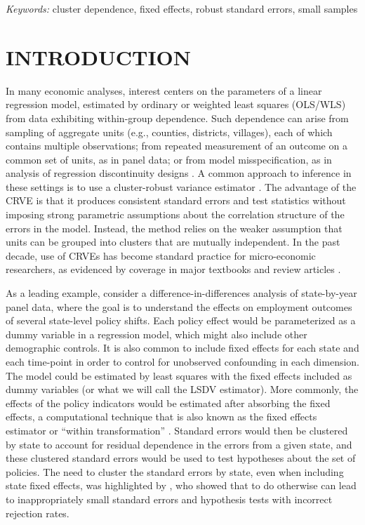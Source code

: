 \documentclass[12pt]{article}\usepackage[]{graphicx}\usepackage[]{color}
\begin{document}
\noindent%
{\it Keywords:} cluster dependence, fixed effects, robust standard errors, small samples
\vfill

\newpage
{} %


\section{INTRODUCTION}
\label{sec:intro}

In many economic analyses, interest centers on the parameters of a linear regression model, estimated by ordinary or weighted least squares (OLS/WLS) from data exhibiting within-group dependence. 
Such dependence can arise from sampling of aggregate units (e.g., counties, districts, villages), each of which contains multiple observations; from repeated measurement of an outcome on a common set of units, as in panel data; or from model misspecification, as in analysis of regression discontinuity designs \citep[e.g.,][]{Lee2008regression}. 
A common approach to inference in these settings is to use a cluster-robust variance estimator \citep[CRVE;][]{Arellano1987computing, Liang1986longitudinal, white1984asymptotic}.
The advantage of the CRVE is that it produces consistent standard errors and test statistics without imposing strong parametric assumptions about the correlation structure of the errors in the model.
Instead, the method relies on the weaker assumption that units can be grouped into clusters that are mutually independent. 
In the past decade, use of CRVEs has become standard practice for micro-economic researchers, as evidenced by coverage in major textbooks and review articles \citep[e.g.,][]{Wooldridge2010econometric, Angrist2009mostly, Cameron2015practitioners}.

As a leading example, consider a difference-in-differences analysis of state-by-year panel data, where the goal is to understand the effects on employment outcomes of several state-level policy shifts. 
Each policy effect would be parameterized as a dummy variable in a regression model, which might also include other demographic controls. It is also common to include fixed effects for each state and each time-point in order to control for unobserved confounding in each dimension. 
The model could be estimated by least squares with the fixed effects included as dummy variables (or what we will call the LSDV estimator). More commonly, the effects of the policy indicators would be estimated after absorbing the fixed effects, a computational technique that is also known as the fixed effects estimator or ``within transformation'' \citep{Wooldridge2010econometric}. 
Standard errors would then be clustered by state to account for residual dependence in the errors from a given state, and these clustered standard errors would be used to test hypotheses about the set of policies.
The need to cluster the standard errors by state, even when including state fixed effects, was highlighted by \citet{Bertrand2004how}, who showed that to do otherwise can lead to inappropriately small standard errors and hypothesis tests with incorrect rejection rates. 
\end{document}

